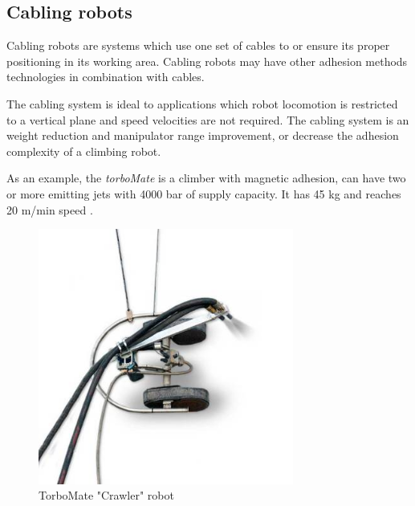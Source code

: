 \subsection{Cabling robots}
Cabling robots are systems which use one set of cables to or ensure its proper
positioning in its working area. Cabling robots may have other
adhesion methods technologies in combination with cables.

The cabling system is ideal to applications which robot locomotion is
restricted to a vertical plane and speed velocities are not required. The
cabling system is an weight reduction and manipulator range improvement, or
decrease the adhesion complexity of a climbing robot.

As an example, the \textit{torboMate} is a climber with magnetic
adhesion, can have two or more emitting jets with 4000 bar of supply capacity.
It has 45 kg and reaches 20 m/min speed \citep{torbo}.

\begin{figure}[ht]
	\centering
	\includegraphics[width=8.4cm]{figs/cables/torbo}
	\caption{TorboMate "Crawler" robot}
	\label{fig:cables:torbo}
\end{figure}

